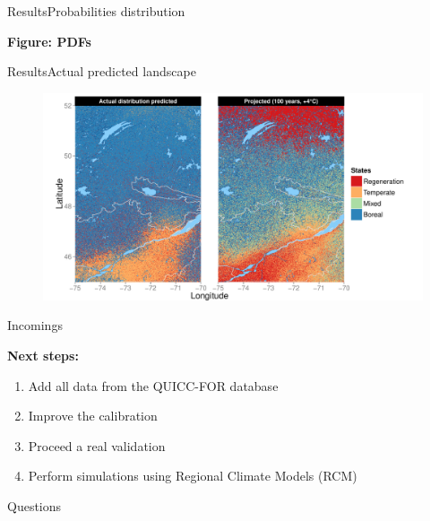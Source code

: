 \documentclass[10pt,aspectratio=149]{beamer}
\begin{document}

\begin{frame}{Results}{Probabilities distribution}

\begin{centering}
	\textbf{Figure: PDFs}
\end{centering}

\end{frame}



\begin{frame}[t]{Results}{Actual predicted landscape}

		\begin{figure}
			\vspace{-1.5em}
			\includegraphics[height=0.79\paperheight]{Figs/outModel.pdf}
		\end{figure}

\end{frame}



\begin{frame}{Incomings}

\textbf{Next steps:}
\begin{enumerate}
	\item Add all data from the QUICC-FOR database
	\item Improve the calibration
	\item Proceed a real validation
	\item Perform simulations using Regional Climate Models (RCM)
\end{enumerate}

\end{frame}


\begin{frame}[plain]{Questions}



\end{frame}

\end{document}
